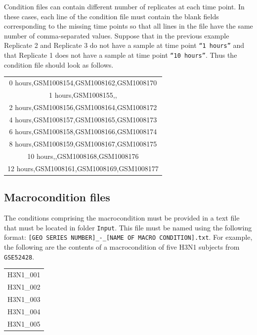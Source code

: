 \documentclass[final,letterpaper,12pt]{article}
\begin{document}
\par Condition files can contain different number of replicates at each time point. In these cases, each line of the condition file must contain the blank fields corresponding to the missing time points so that all lines in the file have the same number of comma-separated values. Suppose that in the previous example Replicate 2 and Replicate 3 do not have a sample at time point \texttt{``1 hours''} and that Replicate 1 does not have a sample at time point \texttt{``10 hours''}. Thus the condition file should look as follows.

\begin{center}
\begin{tabular}{ c }

0 hours,GSM1008154,GSM1008162,GSM1008170 \\
1 hours,GSM1008155,, \\
2 hours,GSM1008156,GSM1008164,GSM1008172 \\
4 hours,GSM1008157,GSM1008165,GSM1008173 \\
6 hours,GSM1008158,GSM1008166,GSM1008174 \\
8 hours,GSM1008159,GSM1008167,GSM1008175 \\
10 hours,,GSM1008168,GSM1008176 \\
12 hours,GSM1008161,GSM1008169,GSM1008177 \\


\end{tabular}
\end{center}

\subsection{Macrocondition files}
\label{subsection:macrocondition}

\par The conditions comprising the macrocondition must be provided in a text file that must be located in folder \texttt{Input}. This file must be named using the following format: \texttt{[GEO SERIES NUMBER]\_-\_[NAME OF MACRO CONDITION].txt}. For example, the following are the contents of a macrocondition of five H3N1 subjects from \texttt{GSE52428}.

\begin{center}
\begin{tabular}{ c }

H3N1\_001 \\
H3N1\_002 \\
H3N1\_003 \\
H3N1\_004 \\
H3N1\_005 \\

\end{tabular}
\end{center}
\end{document}
